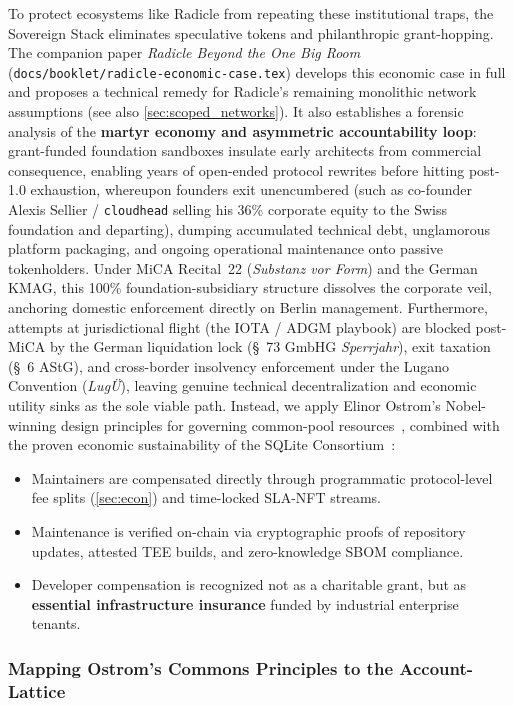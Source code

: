 \documentclass[a4paper,11pt,twoside,parskip=half-,headings=small]{scrartcl}
\newcommand{\code}[1]{\texttt{#1}}
\begin{document}
To protect ecosystems like Radicle from repeating these institutional traps, the
Sovereign Stack eliminates speculative tokens and philanthropic grant-hopping.
The companion paper \emph{Radicle Beyond the One Big Room}
(\code{docs/booklet/radicle-economic-case.tex}) develops this economic case in full and
proposes a technical remedy for Radicle's remaining monolithic network assumptions
(see also \cref{sec:scoped_networks}).
It also establishes a forensic analysis of the \textbf{martyr economy and asymmetric accountability loop}:
grant-funded foundation sandboxes insulate early architects from commercial consequence, enabling
years of open-ended protocol rewrites before hitting post-1.0 exhaustion, whereupon founders exit unencumbered
(such as co-founder Alexis Sellier / \code{cloudhead} selling his 36\% corporate equity to the Swiss
foundation and departing), dumping accumulated technical debt, unglamorous platform packaging, and
ongoing operational maintenance onto passive tokenholders.
Under MiCA Recital~22 (\emph{Substanz vor Form}) and the German KMAG, this 100\% foundation-subsidiary
structure dissolves the corporate veil, anchoring domestic enforcement directly on Berlin management.
Furthermore, attempts at jurisdictional flight (the IOTA / ADGM playbook) are blocked post-MiCA by the
German liquidation lock (\S~73 GmbHG \emph{Sperrjahr}), exit taxation (\S~6 AStG), and cross-border
insolvency enforcement under the Lugano Convention (\emph{Lug{\"U}}), leaving genuine technical
decentralization and economic utility sinks as the sole viable path.
Instead, we apply Elinor Ostrom's Nobel-winning design principles for governing
common-pool resources~\cite{ostrom1990}, combined with the proven economic sustainability
of the SQLite Consortium~\cite{sqlite2025}:
\begin{itemize}
  \item Maintainers are compensated directly through programmatic protocol-level
fee splits (\cref{sec:econ}) and time-locked SLA-NFT streams.
  \item Maintenance is verified on-chain via cryptographic proofs of repository
updates, attested TEE builds, and zero-knowledge SBOM compliance.
  \item Developer compensation is recognized not as a charitable grant, but as
\textbf{essential infrastructure insurance} funded by industrial enterprise tenants.
\end{itemize}

\subsubsection{Mapping Ostrom's Commons Principles to the Account-Lattice}
\end{document}
